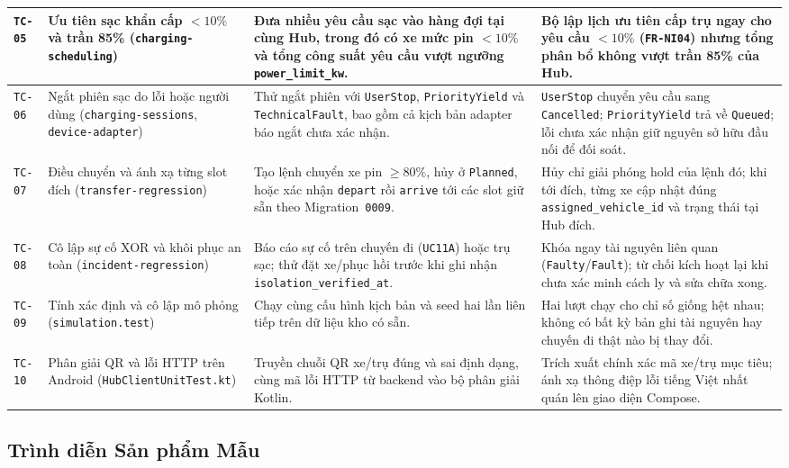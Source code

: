 \begin{longtable}{>{\centering\arraybackslash}p{1.2cm} >{\raggedright\arraybackslash\small}p{4.1cm} >{\raggedright\arraybackslash}p{4.2cm} >{\raggedright\arraybackslash}p{4.8cm}}
\midrule
\texttt{TC-05} & Ưu tiên sạc khẩn cấp $<10\%$ và trần 85\% (\texttt{charging-scheduling}) & Đưa nhiều yêu cầu sạc vào hàng đợi tại cùng Hub, trong đó có xe mức pin $<10\%$ và tổng công suất yêu cầu vượt ngưỡng \texttt{power\_limit\_kw}. & Bộ lập lịch ưu tiên cấp trụ ngay cho yêu cầu $<10\%$ (\texttt{FR-NI04}) nhưng tổng phân bổ không vượt trần 85\% của Hub. \\
\midrule
\texttt{TC-06} & Ngắt phiên sạc do lỗi hoặc người dùng (\texttt{charging-sessions}, \texttt{device-adapter}) & Thử ngắt phiên với \texttt{UserStop}, \texttt{PriorityYield} và \texttt{TechnicalFault}, bao gồm cả kịch bản adapter báo ngắt chưa xác nhận. & \texttt{UserStop} chuyển yêu cầu sang \texttt{Cancelled}; \texttt{PriorityYield} trả về \texttt{Queued}; lỗi chưa xác nhận giữ nguyên sở hữu đầu nối để đối soát. \\
\midrule
\texttt{TC-07} & Điều chuyển và ánh xạ từng slot đích (\texttt{transfer-regression}) & Tạo lệnh chuyển xe pin $\ge 80\%$, hủy ở \texttt{Planned}, hoặc xác nhận \texttt{depart} rồi \texttt{arrive} tới các slot giữ sẵn theo Migration~\texttt{0009}. & Hủy chỉ giải phóng hold của lệnh đó; khi tới đích, từng xe cập nhật đúng \texttt{assigned\_vehicle\_id} và trạng thái tại Hub đích. \\
\midrule
\texttt{TC-08} & Cô lập sự cố XOR và khôi phục an toàn (\texttt{incident-regression}) & Báo cáo sự cố trên chuyến đi (\texttt{UC11A}) hoặc trụ sạc; thử đặt xe/phục hồi trước khi ghi nhận \texttt{isolation\_\allowbreak verified\_at}. & Khóa ngay tài nguyên liên quan (\texttt{Faulty}/\texttt{Fault}); từ chối kích hoạt lại khi chưa xác minh cách ly và sửa chữa xong. \\
\midrule
\texttt{TC-09} & Tính xác định và cô lập mô phỏng (\texttt{simulation.test}) & Chạy cùng cấu hình kịch bản và seed hai lần liên tiếp trên dữ liệu kho có sẵn. & Hai lượt chạy cho chỉ số giống hệt nhau; không có bất kỳ bản ghi tài nguyên hay chuyến đi thật nào bị thay đổi. \\
\midrule
\texttt{TC-10} & Phân giải QR và lỗi HTTP trên Android (\texttt{HubClientUnitTest.kt}) & Truyền chuỗi QR xe/trụ đúng và sai định dạng, cùng mã lỗi HTTP từ backend vào bộ phân giải Kotlin. & Trích xuất chính xác mã xe/trụ mục tiêu; ánh xạ thông điệp lỗi tiếng Việt nhất quán lên giao diện Compose. \\
\bottomrule
\end{longtable}

\subsection{Trình diễn Sản phẩm Mẫu}

